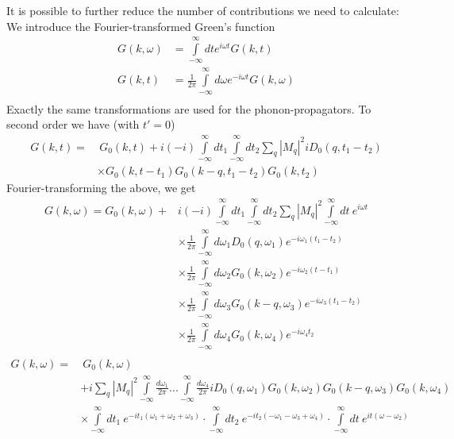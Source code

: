 It is possible to further reduce the number of contributions we need to calculate: We introduce the Fourier-transformed Green's function
\[\begin{aligned}
    G(k,\omega) &= \int\limits_{-\infty}^{\infty} dt e^{i\omega t} G(k,t)\\
    G(k,t) &= \frac{1}{2\pi}\int\limits_{-\infty}^{\infty} d\omega e^{-i\omega t} G(k,\omega)\\
\end{aligned}\]
Exactly the same transformations are used for the phonon-propagators. To second order we have (with $t'=0$)
\[\begin{aligned}
    G(k,t) =&~ G_0(k,t) + i(-i) \int\limits_{-\infty}^{\infty} dt_1 \int\limits_{-\infty}^{\infty} dt_2 \sum_q \left|M_q\right|^2 iD_0(q, t_1-t_2) \\&\times G_0(k, t-t_1) G_0(k-q, t_1-t_2) G_0(k, t_2)
\end{aligned}
\]
Fourier-transforming the above, we get
\[\begin{aligned}
    G(k,\omega) = G_0(k, \omega) + &i(-i)\int\limits_{-\infty}^{\infty}dt_1\int\limits_{-\infty}^{\infty}dt_2 \sum_q \left|M_q\right|^2 \int\limits_{-\infty}^{\infty}dt~e^{i\omega t}\\
    &\times \frac{1}{2\pi}\int\limits_{-\infty}^{\infty} d\omega_1 D_0(q, \omega_1)e^{-i\omega_1(t_1-t_2)}\\
    &\times \frac{1}{2\pi}\int\limits_{-\infty}^{\infty} d\omega_2 G_0(k, \omega_2)e^{-i\omega_2(t-t_1)}\\
    &\times \frac{1}{2\pi}\int\limits_{-\infty}^{\infty} d\omega_3 G_0(k-q, \omega_3)e^{-i\omega_3(t_1-t_2)}\\
    &\times \frac{1}{2\pi}\int\limits_{-\infty}^{\infty} d\omega_4 G_0(k, \omega_4)e^{-i\omega_4t_2}\\
\end{aligned}\]
\[\begin{aligned}
    G(k,\omega) = &~G_0(k,\omega)\\ 
    &+ i\sum_q\left|M_q\right|^2 \int\limits_{-\infty}^{\infty} \frac{d\omega_1}{2\pi}... \int\limits_{-\infty}^{\infty} \frac{d\omega_4}{2\pi} iD_0(q, \omega_1) G_0(k,\omega_2) G_0(k-q,\omega_3)G_0(k,\omega_4)\\
    &\times \int\limits_{-\infty}^{\infty} dt_1~ e^{-it_1(\omega_1+\omega_2+\omega_3)} \cdot \int\limits_{-\infty}^{\infty} dt_2~ e^{-it_2(-\omega_1-\omega_3+\omega_4)} \cdot \int\limits_{-\infty}^{\infty} dt~ e^{it(\omega-\omega_2)}  
\end{aligned}\]
